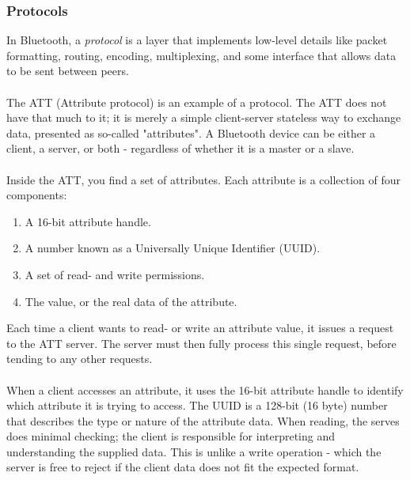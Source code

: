 \documentclass[11pt,a4paper]{article}
\begin{document}
\subsubsection{Protocols}
In Bluetooth, a \textit{protocol} is a layer that implements low-level details like packet formatting, routing, encoding, multiplexing, and some interface that allows data to be sent between peers.\\
\\
The ATT (Attribute protocol) is an example of a protocol. The ATT does not have that much to it; it is merely a simple client-server stateless way to exchange data, presented as so-called "attributes". A Bluetooth device can be either a client, a server, or both - regardless of whether it is a master or a slave.\\
\\
Inside the ATT, you find a set of attributes. Each attribute is a collection of four components:
\begin{enumerate}
\item A 16-bit attribute handle.
\item A number known as a Universally Unique Identifier (UUID).
\item A set of read- and write permissions.
\item The value, or the real data of the attribute.
\end{enumerate}
Each time a client wants to read- or write an attribute value, it issues a request to the ATT server. The server must then fully process this single request, before tending to any other requests.\\
\\
When a client accesses an attribute, it uses the 16-bit attribute handle to identify which attribute it is trying to access. The UUID is a 128-bit (16 byte) number that describes the type or nature of the attribute data. When reading, the serves does minimal checking; the client is responsible for interpreting and understanding the supplied data. This is unlike a write operation - which the server is free to reject if the client data does not fit the expected format.
\end{document}

